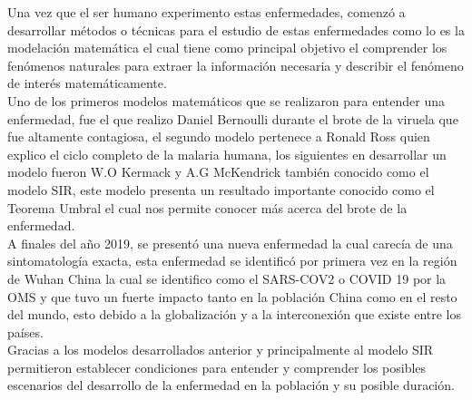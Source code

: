 Una vez que el ser humano experimento estas enfermedades, comenzó a desarrollar métodos o técnicas para el estudio de estas enfermedades 
como lo es la modelación matemática el cual tiene como principal objetivo el comprender los fenómenos naturales para extraer la información necesaria y describir el fenómeno de interés matemáticamente.\\ 

Uno de los primeros modelos matemáticos que se realizaron para entender una enfermedad, fue el que realizo Daniel Bernoulli durante el brote de la viruela que fue altamente contagiosa, el segundo modelo pertenece a Ronald Ross quien explico el ciclo completo de la malaria humana, los siguientes en desarrollar un modelo fueron W.O Kermack y A.G McKendrick también conocido como el modelo SIR, este modelo presenta un resultado importante conocido como el Teorema Umbral el cual nos permite conocer más acerca del brote de la enfermedad.\\

A finales del año 2019, se presentó una nueva enfermedad la cual carecía de una sintomatología exacta, esta enfermedad se identificó por primera vez en la región de Wuhan China la cual se identifico como el SARS-COV2 o COVID 19 por la OMS y que tuvo un fuerte impacto tanto en la población China como en el resto del mundo, esto debido a la globalización y a la interconexión que existe entre los países.\\

Gracias a los modelos desarrollados anterior y principalmente al modelo SIR permitieron establecer condiciones para entender y comprender los posibles escenarios del desarrollo de la enfermedad en la población y su posible duración.\\



%